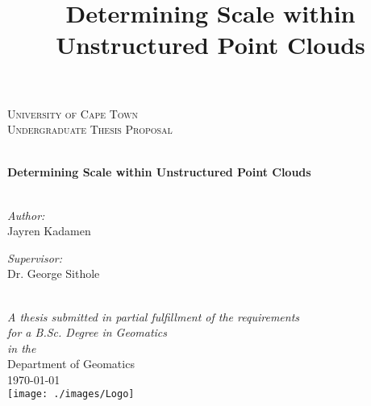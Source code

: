 
\frontmatter	  %

	\begin{center}
		
		\textsc{\LARGE University of Cape Town}\\[1.5cm] %
		\textsc{\Large Undergraduate Thesis Proposal}\\[0.5cm] %
		
		\HRule \\[0.4cm] %
		\title{Determining Scale within Unstructured Point Clouds}
		{\huge \bfseries Determining Scale within Unstructured Point Clouds}\\[0.4cm] %
		\HRule \\[1.5cm] %
		
		\begin{minipage}{0.4\textwidth}
			\begin{flushleft} \large
				\emph{Author:}\\
				\textnormal{Jayren Kadamen} %
			\end{flushleft}
		\end{minipage}
		\begin{minipage}{0.4\textwidth}
			\begin{flushright} \large
				\emph{Supervisor:} \\
				\textnormal{Dr. George Sithole} %
			\end{flushright}
		\end{minipage}\\[3cm]
		
		\large \textit{A thesis submitted in partial fulfillment of the requirements\\ for a B.Sc. Degree in Geomatics}\\[0.3cm] %
		\textit{in the}\\[0.4cm]
		Department of Geomatics\\[2cm] %
		
		{\large \today}\\[1cm] %
		\texttt{[image: ./images/Logo]} %
		
		\vfill
	\end{center}